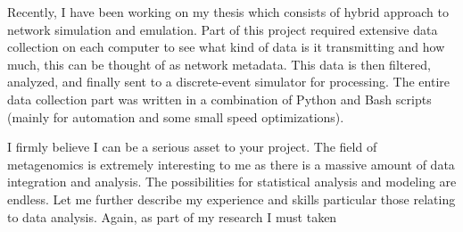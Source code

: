 \documentclass[11pt,a4paper,sans]{moderncv}        %
\begin{document}
Recently, I have been working on my thesis which consists of hybrid approach to network
simulation and emulation. Part of this project required extensive data collection on each
computer to see what kind of data is it transmitting and how much, this can be thought of as
network metadata. This data is then filtered, analyzed, and finally sent to a discrete-event 
simulator for processing. The entire data collection part was written in a combination of 
Python and Bash scripts (mainly for automation and some small speed optimizations).

I firmly believe I can be a serious asset to your project. The field of metagenomics is
extremely interesting to me as there is a massive amount of data integration and analysis. The
possibilities for statistical analysis and modeling are endless. Let me further describe my
experience and skills particular those relating to data analysis. Again, as part of my research
I must taken
\end{document}
